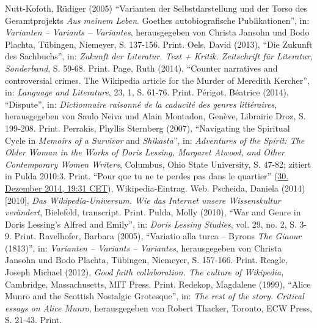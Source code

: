 \documentclass[fontsize=12pt]{scrartcl}
\begin{document}
{{{{\begin{thebibliography}
	Nutt-Kofoth, R\"udiger (2005) "`Varianten der Selbstdarstellung und der Torso des Gesamtprojekts \textit{Aus meinem Leben}. Goethes autobiografische Publikationen"', in: \textit{Varianten -- Variants -- Variantes}, he\-rausgegeben von Christa Jansohn und Bodo Plachta, T\"ubingen, Niemeyer, S. 137-156. Print.
	Oels, David (2013), "`Die Zukunft des Sachbuchs"', in: \textit{Zukunft der Li\-te\-ra\-tur. Text + Kritik. Zeitschrift f\"ur Li\-te\-ra\-tur, Sonderband}, S. 59-68. Print.
	Page, Ruth (2014), "`Counter narratives and controversial crimes. The Wi\-ki\-pe\-dia article for the \flq Murder of Meredith Kercher\frq"', in: \textit{Language and Li\-te\-ra\-tur\-e}, 23, 1, S. 61-76. Print.
	P\'{e}rigot, B\'{e}atrice (2014), "`Dispute"', in: \textit{Dictionnaire raisonn\'{e} de la caducit\'{e} des genres litt\'{e}raires}, he\-rausgegeben von Saulo Neiva und Alain Montadon, Gen\`{e}ve, Librairie Droz, S. 199-208. Print.
	Perrakis, Phyllis Sternberg (2007), "`Navigating the Spiritual Cycle in \textit{Memoirs of a Survivor} and \textit{Shikasta}"', in: \textit{Adventures of the Spirit: The Older Woman in the Works of Doris Lessing, Margaret Atwood, and Other Contemporary Women Writers}, Columbus, Ohio State University, S. 47-82; zitiert in Pulda 2010:3. Print.
	"`Pour que tu ne te perdes pas dans le quartier"' (\href{https://de.wikipedia.org/w/index.php?title=Pour_que_tu_ne_te_perdes_pas_dans_le_quartier\&oldid=137248287}{30. Dezember 2014, 19:31 CET}), Wi\-ki\-pe\-dia-Ein\-trag. Web.
	Pscheida, Daniela (2014) [2010], \textit{Das Wi\-ki\-pe\-dia-Universum. Wie das Internet unsere Wissenskultur ver\"andert}, Bielefeld, transcript. Print.
	Pulda, Molly (2010), "`War and Genre in Doris Lessing's Alfred and Emily"', in: \textit{Doris Lessing Studies}, vol. 29, no. 2, S. 3-9. Print.
	Ravelhofer, Barbara (2005), "`Variatio alla turca -- Byrons \textit{The Giaour} (1813)"', in: \textit{Varianten -- Variants -- Variantes}, he\-rausgegeben von Christa Jansohn und Bodo Plachta, T\"ubingen, Niemeyer, S. 157-166. Print.
	Reagle, Joseph Michael (2012), \textit{Good faith collaboration. The culture of Wi\-ki\-pe\-dia}, Cambridge, Massachusetts, MIT Press. Print.
	Redekop, Magdalene (1999), "`Alice Munro and the Scottish Nostalgic Grotesque"', in: \textit{The rest of the story. Critical essays on Alice Munro}, he\-rausgegeben von Robert Thacker, Toronto, ECW Press, S. 21-43. Print.

\end{thebibliography}}}}}
\end{document}
